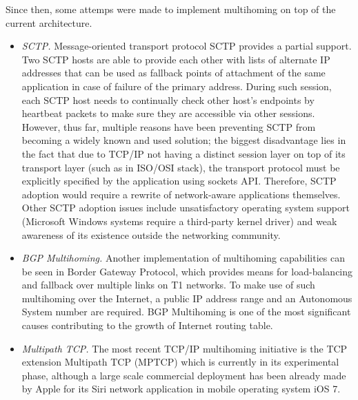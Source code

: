         Since then, some attemps were made to implement multihoming on top of the current architecture.

        \begin{itemize}
            \item \emph{SCTP.}
            Message-oriented transport protocol SCTP provides a partial support. Two SCTP hosts are able to provide each other with lists of alternate IP addresses that can be used as fallback points of attachment of the same application in case of failure of the primary address. During such session, each SCTP host needs to continually check other host's endpoints by heartbeat packets to make sure they are accessible via other sessions. However, thus far, multiple reasons have been preventing SCTP from becoming a widely known and used solution; the biggest disadvantage lies in the fact that due to TCP/IP not having a distinct session layer on top of its transport layer (such as in ISO/OSI stack), the transport protocol must be explicitly specified by the application using sockets API. Therefore, SCTP adoption would require a rewrite of network-aware applications themselves. Other SCTP adoption issues include unsatisfactory operating system support (Microsoft Windows systems require a third-party kernel driver) and weak awareness of its existence outside the networking community.

            \item \emph{BGP Multihoming.} Another implementation of multihoming capabilities can be seen in Border Gateway Protocol, which provides means for load-balancing and fallback over multiple links on T1 networks. To make use of such multihoming over the Internet, a public IP address range and an Autonomous System number are required. BGP Multihoming is one of the most significant causes contributing to the growth of Internet routing table.

            \item \emph{Multipath TCP.} The most recent TCP/IP multihoming initiative is the TCP extension Multipath TCP (MPTCP) which is currently in its experimental phase, although a large scale commercial deployment has been already made by Apple for its Siri network application in mobile operating system iOS 7.

        \end{itemize}

